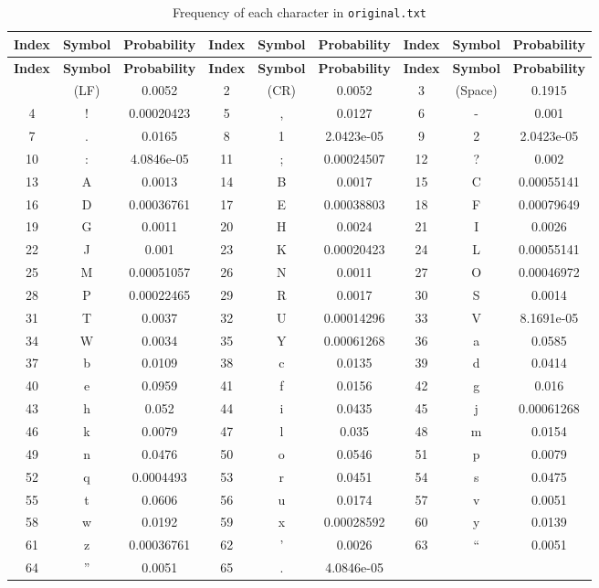 \documentclass[12pt,twoside]{article}
\begin{document}
\begin{longtable}{ccc||ccc||ccc}
    \caption{Frequency of each character in \texttt{original.txt}}
    \label{tab:frequency} \\
    \toprule
    \textbf{Index} & \textbf{Symbol} & \textbf{Probability} & \textbf{Index} & \textbf{Symbol} & \textbf{Probability} & \textbf{Index} & \textbf{Symbol} & \textbf{Probability} \\ \hline
    \endfirsthead
    \hline
    \textbf{Index} & \textbf{Symbol} & \textbf{Probability} & \textbf{Index} & \textbf{Symbol} & \textbf{Probability} & \textbf{Index} & \textbf{Symbol} & \textbf{Probability} \\ \hline
    \endhead
    \hline
    \endfoot
    1 & (LF) & 0.0052 & 2 & (CR) & 0.0052 & 3 & (Space) & 0.1915 \\ 
    4 & ! & 0.00020423 & 5 & , & 0.0127 & 6 & - & 0.001 \\ 
    7 & . & 0.0165 & 8 & 1 & 2.0423e-05 & 9 & 2 & 2.0423e-05 \\ 
    10 & : & 4.0846e-05 & 11 & ; & 0.00024507 & 12 & ? & 0.002 \\ 
    13 & A & 0.0013 & 14 & B & 0.0017 & 15 & C & 0.00055141 \\ 
    16 & D & 0.00036761 & 17 & E & 0.00038803 & 18 & F & 0.00079649 \\ 
    19 & G & 0.0011 & 20 & H & 0.0024 & 21 & I & 0.0026 \\ 
    22 & J & 0.001 & 23 & K & 0.00020423 & 24 & L & 0.00055141 \\ 
    25 & M & 0.00051057 & 26 & N & 0.0011 & 27 & O & 0.00046972 \\ 
    28 & P & 0.00022465 & 29 & R & 0.0017 & 30 & S & 0.0014 \\ 
    31 & T & 0.0037 & 32 & U & 0.00014296 & 33 & V & 8.1691e-05 \\ 
    34 & W & 0.0034 & 35 & Y & 0.00061268 & 36 & a & 0.0585 \\ 
    37 & b & 0.0109 & 38 & c & 0.0135 & 39 & d & 0.0414 \\ 
    40 & e & 0.0959 & 41 & f & 0.0156 & 42 & g & 0.016 \\ 
    43 & h & 0.052 & 44 & i & 0.0435 & 45 & j & 0.00061268 \\ 
    46 & k & 0.0079 & 47 & l & 0.035 & 48 & m & 0.0154 \\ 
    49 & n & 0.0476 & 50 & o & 0.0546 & 51 & p & 0.0079 \\ 
    52 & q & 0.0004493 & 53 & r & 0.0451 & 54 & s & 0.0475 \\ 
    55 & t & 0.0606 & 56 & u & 0.0174 & 57 & v & 0.0051 \\ 
    58 & w & 0.0192 & 59 & x & 0.00028592 & 60 & y & 0.0139 \\ 
    61 & z & 0.00036761 & 62 & ' & 0.0026 & 63 & `` & 0.0051 \\ 
    64 & '' & 0.0051 & 65 & . & 4.0846e-05 &  &  &  \\ 
    \bottomrule
\end{longtable}
\end{document}
